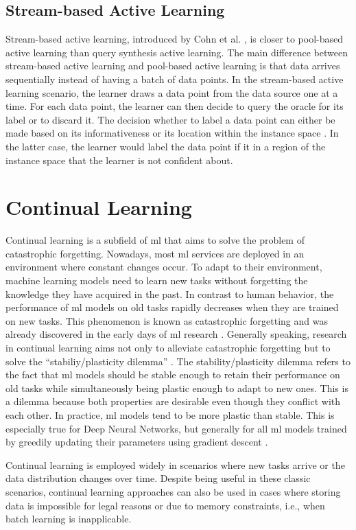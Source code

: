 \subsection{Stream-based Active Learning}
\label{sec:StreamBasedActiveLearning}
Stream-based active learning, introduced by Cohn et al. \cite{cohn1994improving}, is closer to pool-based active learning than query synthesis
active learning. The main difference between stream-based active learning and pool-based active learning is that data arrives sequentially
instead of having a batch of data points. In the stream-based active learning scenario, the learner draws a data point from the data source
one at a time. For each data point, the learner can then decide to query the oracle for its label or to discard it. The decision whether to label a
data point can either be made based on its informativeness \cite{dagan1995committee} or its location within the instance space \cite{cohn1994improving}.
In the latter case, the learner would label the data point if it in a region of the instance space that the learner is not confident about.

\section{Continual Learning}
\label{sec:ContinualLearning}
Continual learning is a subfield of \gls{ml} that aims to solve the problem of catastrophic forgetting. Nowadays, most \gls{ml} services are deployed
in an environment where constant changes occur. To adapt to their environment, machine learning models need to learn new tasks without forgetting the knowledge
they have acquired in the past. In contrast to human behavior, the performance of \gls{ml} models on old tasks rapidly decreases when they are trained
on new tasks. This phenomenon is known as catastrophic forgetting and was already discovered in the early days of \gls{ml} research \cite{mccloskey1989catastrophic}.
Generally speaking, research in continual learning aims not only to alleviate catastrophic forgetting but to solve the 
\enquote{stabiliy/plasticity dilemma} \cite{carpenter1988art}. The stability/plasticity dilemma refers to the fact that \gls{ml} models
should be stable enough to retain their performance on old tasks while simultaneously being plastic enough to adapt to new ones. This is a dilemma
because both properties are desirable even though they conflict with each other. In practice, \gls{ml} models tend to be more plastic than stable.
This is especially true for Deep Neural Networks, but generally for all \gls{ml} models trained by greedily updating their parameters using
gradient descent \cite{mundt2020wholistic}. \par
Continual learning is employed widely in scenarios where new tasks arrive or the data distribution changes over time. Despite being useful
in these classic scenarios, continual learning approaches can also be used in cases where storing data is impossible for legal reasons or due to memory
constraints, i.e., when batch learning is inapplicable. 


